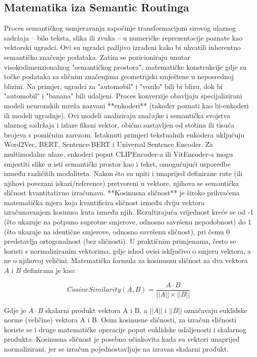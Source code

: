 \subsection{Matematika iza Semantic Routinga}
Proces semantičkog usmjeravanja započinje transformacijom sirovog ulaznog sadržaja – bilo teksta, slika ili zvuka – u numeričke reprezentacije poznate kao vektorski ugradci. Ovi su ugradci pažljivo izrađeni kako bi uhvatili inherentno semantičko značenje podataka. Zatim se pozicioniraju unutar visokodimenzionalnog "semantičkog prostora", matematičke konstrukcije gdje su točke podataka sa sličnim značenjima geometrijski smještene u neposrednoj blizini. Na primjer, ugradci za "automobil" i "vozilo" bili bi blizu, dok bi "automobil" i "banana" bili udaljeni. Proces konverzije obavljaju specijalizirani modeli neuronskih mreža nazvani **enkoderi** (također poznati kao bi-enkoderi ili modeli ugradnje). Ovi modeli analiziraju značajke i semantička svojstva ulaznog sadržaja i izlaze fiksni vektor, obično sastavljen od stotina ili tisuća brojeva s pomičnim zarezom. Istaknuti primjeri tekstualnih enkodera uključuju Word2Vec, BERT, Sentence-BERT i Universal Sentence Encoder. Za multimodalne ulaze, enkoderi poput CLIPEncoder-a ili VitEncoder-a mogu smjestiti slike u isti semantički prostor kao i tekst, omogućujući usporedbe između različitih modaliteta.
Nakon što su upiti i unaprijed definirane rute (ili njihovi povezani iskazi/reference) pretvoreni u vektore, njihova se semantička sličnost kvantitativno izračunava. **Kosinusna sličnost** je široko prihvaćena matematička mjera koja kvantificira sličnost između dviju vektora izračunavanjem kosinusa kuta između njih. Rezultirajuća vrijednost kreće se od -1 (što ukazuje na potpuno suprotne smjerove, odnosno savršenu nepodobnost) do 1 (što ukazuje na identične smjerove, odnosno savršenu sličnost), pri čemu 0 predstavlja ortogonalnost (bez sličnosti). U praktičnim primjenama, često se koristi s normaliziranim vektorima, gdje ishod ovisi isključivo o smjeru vektora, a ne o njihovoj veličini. Matematička formula za kosinusnu sličnost za dva vektora $A$ i $B$ definirana je kao:

$$CosineSimilarity(A, B) = \frac{A \cdot B}{||A|| \times ||B||}$$

Gdje je $A \cdot B$ skalarni produkt vektora A i B, a $||A||$ i $||B||$ označavaju euklidske norme (veličine) vektora A i B. Osim kosinusne sličnosti, za izračun sličnosti koriste se i druge matematičke operacije poput euklidske udaljenosti i skalarnog produkta. Kosinusna sličnost je posebno učinkovita kada su vektori unaprijed normalizirani, jer se izračun pojednostavljuje na izravan skalarni produkt.

